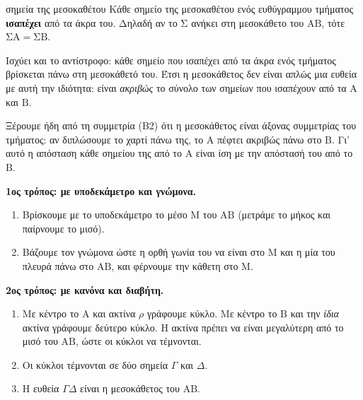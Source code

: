 \begin{center}
\end{center}

\begin{idiotita}{σημεία της μεσοκαθέτου}
Κάθε σημείο της μεσοκαθέτου ενός ευθύγραμμου τμήματος \textbf{ισαπέχει} από τα άκρα του. Δηλαδή αν το $\mathrm{Σ}$ ανήκει στη μεσοκάθετο του $\mathrm{ΑΒ}$, τότε $\mathrm{ΣΑ}=\mathrm{ΣΒ}$.
\end{idiotita}

Ισχύει και το αντίστροφο: κάθε σημείο που ισαπέχει από τα άκρα ενός τμήματος βρίσκεται πάνω στη μεσοκάθετό του. Έτσι η μεσοκάθετος δεν είναι απλώς μια ευθεία με αυτή την ιδιότητα: είναι \emph{ακριβώς} το σύνολο των σημείων που ισαπέχουν από τα $\mathrm{Α}$ και $\mathrm{Β}$.

Ξέρουμε ήδη από τη συμμετρία (Β2) ότι η μεσοκάθετος είναι άξονας συμμετρίας του τμήματος: αν διπλώσουμε το χαρτί πάνω της, το $\mathrm{Α}$ πέφτει ακριβώς πάνω στο $\mathrm{Β}$. Γι' αυτό η απόσταση κάθε σημείου της από το $\mathrm{Α}$ είναι ίση με την απόστασή του από το $\mathrm{Β}$.


\textbf{1ος τρόπος: με υποδεκάμετρο και γνώμονα.}
\begin{enumerate}[leftmargin=1.6em,itemsep=0.3ex,topsep=2pt]
\item Βρίσκουμε με το υποδεκάμετρο το μέσο $\mathrm{Μ}$ του $\mathrm{ΑΒ}$ (μετράμε το μήκος και παίρνουμε το μισό).
\item Βάζουμε τον γνώμονα ώστε η ορθή γωνία του να είναι στο $\mathrm{Μ}$ και η μία του πλευρά πάνω στο $\mathrm{ΑΒ}$, και φέρνουμε την κάθετη στο $\mathrm{Μ}$.
\end{enumerate}

\textbf{2ος τρόπος: με κανόνα και διαβήτη.}
\begin{enumerate}[leftmargin=1.6em,itemsep=0.3ex,topsep=2pt]
\item Με κέντρο το $\mathrm{Α}$ και ακτίνα $\rho$ γράφουμε κύκλο. Με κέντρο το $\mathrm{Β}$ και την \emph{ίδια} ακτίνα γράφουμε δεύτερο κύκλο. Η ακτίνα πρέπει να είναι μεγαλύτερη από το μισό του $\mathrm{ΑΒ}$, ώστε οι κύκλοι να τέμνονται.
\item Οι κύκλοι τέμνονται σε δύο σημεία $\Gamma$ και $\Delta$.
\item Η ευθεία $\Gamma\Delta$ είναι η μεσοκάθετος του $\mathrm{ΑΒ}$.
\end{enumerate}

